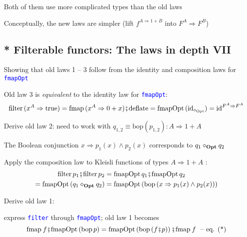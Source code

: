 Both of them use more complicated types than the old laws

Conceptually, the new laws are simpler (lift $f^{A\Rightarrow1+B}$
into $F^{A}\Rightarrow F^{B}$)


\subsection{{*} Filterable functors: The laws in depth VII}

Showing that old laws 1 – 3 follow from the identity and composition
laws for \texttt{\textcolor{blue}{\footnotesize{}fmapOpt}}{\footnotesize\par}

Old law 3 is \emph{equivalent} to the identity law for \texttt{\textcolor{blue}{\footnotesize{}fmapOpt}}:{\footnotesize{}
\[
\text{filter}\,(x^{A}\Rightarrow\text{true})=\text{fmap}\,(x^{A}\Rightarrow0+x)\bef\text{deflate}=\text{fmapOpt}\,(\text{id}_{\diamond_{\text{Opt}}})=\text{id}^{F^{A}\Rightarrow F^{A}}
\]
}{\footnotesize\par}

Derive old law 2: need to work with{\footnotesize{} $q_{1,2}\equiv\text{bop}\left(p_{1,2}\right):A\Rightarrow1+A$ }{\footnotesize\par}

The Boolean conjunction {\footnotesize{}$x\Rightarrow p_{1}(x)\wedge p_{2}(x)$
}corresponds to {\footnotesize{}$q_{1}\diamond_{\text{\textbf{Opt}}}q_{2}$}{\footnotesize\par}

Apply the composition law to Kleisli functions of types {\footnotesize{}$A\Rightarrow1+A$
}:{\footnotesize{}
\begin{align*}
\text{filter}\,p_{1}\bef\text{filter}\,p_{2} & =\text{fmapOpt}\,q_{1}\bef\text{fmapOpt}\,q_{2}\\
=\text{fmapOpt}\left(q_{1}\diamond_{\text{\textbf{Opt}}}q_{2}\right) & =\text{fmapOpt}\left(\text{bop}\left(x\Rightarrow p_{1}(x)\wedge p_{2}(x)\right)\right)
\end{align*}
}{\footnotesize\par}

Derive old law 1:

express \texttt{\textcolor{blue}{\footnotesize{}filter}} through \texttt{\textcolor{blue}{\footnotesize{}fmapOpt}};
old law 1 becomes{\footnotesize{}
\[
\text{fmap}\:f\bef\text{fmapOpt}\left(\text{bop}\,p\right)=\text{fmapOpt}\left(\text{bop}\left(f\bef p\right)\right)\bef\text{fmap}\:f\ \text{ – eq. (*)}
\]
}{\footnotesize\par}

